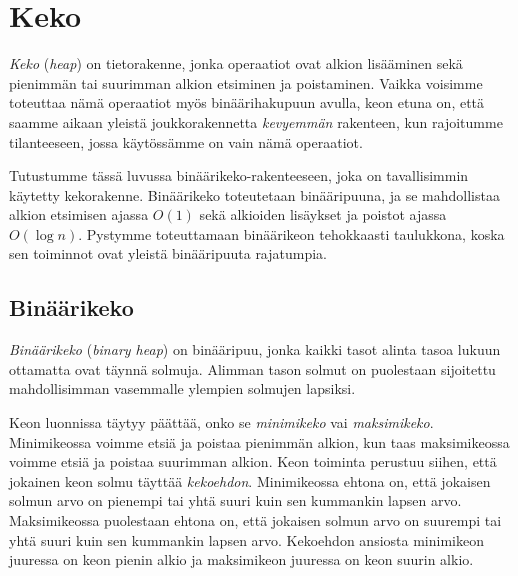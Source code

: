 \chapter{Keko}


\emph{Keko} (\emph{heap}) on tietorakenne, jonka operaatiot ovat
alkion lisääminen sekä
pienimmän tai suurimman alkion etsiminen ja poistaminen.
Vaikka voisimme toteuttaa nämä operaatiot myös
binäärihakupuun avulla, keon etuna on, että saamme aikaan
yleistä joukkorakennetta \emph{kevyemmän} rakenteen, kun
rajoitumme tilanteeseen, jossa käytössämme on vain nämä operaatiot.

Tutustumme tässä luvussa binäärikeko-rakenteeseen,
joka on tavallisimmin käytetty kekorakenne.
Binäärikeko toteutetaan binääripuuna,
ja se mahdollistaa alkion etsimisen ajassa $O(1)$ sekä
alkioiden lisäykset ja poistot ajassa $O(\log n)$.
Pystymme toteuttamaan binäärikeon tehokkaasti taulukkona,
koska sen toiminnot ovat yleistä binääripuuta rajatumpia.

\section{Binäärikeko}


\emph{Binäärikeko} (\emph{binary heap}) on binääripuu, jonka kaikki tasot
alinta tasoa lukuun ottamatta ovat täynnä solmuja.
Alimman tason solmut on puolestaan sijoitettu
mahdollisimman vasemmalle ylempien solmujen lapsiksi.


Keon luonnissa täytyy päättää,
onko se \emph{minimikeko} vai \emph{maksimikeko}.
Minimikeossa voimme etsiä ja poistaa pienimmän alkion,
kun taas maksimikeossa voimme etsiä ja poistaa suurimman alkion.
Keon toiminta perustuu siihen, että jokainen
keon solmu täyttää \emph{kekoehdon}.
Minimikeossa ehtona on, että jokaisen solmun arvo on
pienempi tai yhtä suuri kuin sen kummankin lapsen arvo.
Maksimikeossa puolestaan ehtona on, että jokaisen solmun arvo
on suurempi tai yhtä suuri kuin sen kummankin lapsen arvo.
Kekoehdon ansiosta minimikeon juuressa on keon
pienin alkio ja maksimikeon juuressa on keon suurin alkio.

